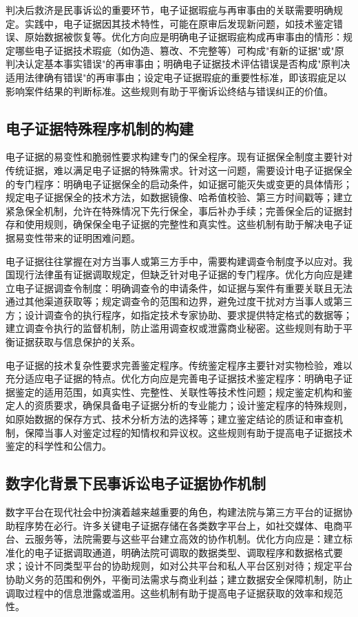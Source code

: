 判决后救济是民事诉讼的重要环节，电子证据瑕疵与再审事由的关联需要明确规定。实践中，电子证据因其技术特性，可能在原审后发现新问题，如技术鉴定错误、原始数据被恢复等。优化方向应是明确电子证据瑕疵构成再审事由的情形：规定哪些电子证据技术瑕疵（如伪造、篡改、不完整等）可构成"有新的证据"或"原判决认定基本事实错误"的再审事由；明确电子证据技术评估错误是否构成"原判决适用法律确有错误"的再审事由；设定电子证据瑕疵的重要性标准，即该瑕疵足以影响案件结果的判断标准。这些规则有助于平衡诉讼终结与错误纠正的价值。

\subsection{电子证据特殊程序机制的构建}

电子证据的易变性和脆弱性要求构建专门的保全程序。现有证据保全制度主要针对传统证据，难以满足电子证据的特殊需求。针对这一问题，需要设计电子证据保全的专门程序：明确电子证据保全的启动条件，如证据可能灭失或变更的具体情形；规定电子证据保全的技术方法，如数据镜像、哈希值校验、第三方时间戳等；建立紧急保全机制，允许在特殊情况下先行保全，事后补办手续；完善保全后的证据封存和使用规则，确保保全电子证据的完整性和真实性。这些机制有助于解决电子证据易变性带来的证明困难问题。

电子证据往往掌握在对方当事人或第三方手中，需要构建调查令制度予以应对。我国现行法律虽有证据调取规定，但缺乏针对电子证据的专门程序。优化方向应是建立电子证据调查令制度：明确调查令的申请条件，如证据与案件有重要关联且无法通过其他渠道获取等；规定调查令的范围和边界，避免过度干扰对方当事人或第三方；设计调查令的执行程序，如指定技术专家协助、要求提供特定格式的数据等；建立调查令执行的监督机制，防止滥用调查权或泄露商业秘密。这些规则有助于平衡证据获取与信息保护的关系。

电子证据的技术复杂性要求完善鉴定程序。传统鉴定程序主要针对实物检验，难以充分适应电子证据的特点。优化方向应是完善电子证据技术鉴定程序：明确电子证据鉴定的适用范围，如真实性、完整性、关联性等技术性问题；规定鉴定机构和鉴定人的资质要求，确保具备电子证据分析的专业能力；设计鉴定程序的特殊规则，如原始数据的保存方式、技术分析方法的选择等；建立鉴定结论的质证和审查机制，保障当事人对鉴定过程的知情权和异议权。这些规则有助于提高电子证据技术鉴定的科学性和公信力。

\subsection{数字化背景下民事诉讼电子证据协作机制}

数字平台在现代社会中扮演着越来越重要的角色，构建法院与第三方平台的证据协助程序势在必行。许多关键电子证据存储在各类数字平台上，如社交媒体、电商平台、云服务等，法院需要与这些平台建立高效的协作机制。优化方向应是：建立标准化的电子证据调取通道，明确法院可调取的数据类型、调取程序和数据格式要求；设计不同类型平台的协助规则，如对公共平台和私人平台区别对待；规定平台协助义务的范围和例外，平衡司法需求与商业利益；建立数据安全保障机制，防止调取过程中的信息泄露或滥用。这些机制有助于提高电子证据获取的效率和规范性。

